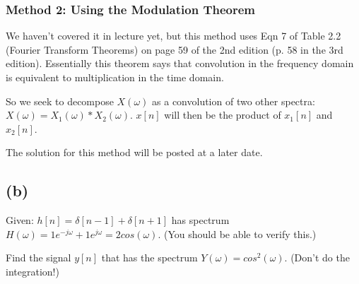 \documentclass[11pt]{article}
\begin{document}
{\subsubsection*{Method 2: Using the Modulation Theorem}
We haven't covered it in lecture yet, but this method uses Eqn 7 of Table 2.2 (Fourier Transform Theorems) on page 59 of the 2nd edition (p. 58 in the 3rd edition). Essentially this theorem says that convolution in the frequency domain is equivalent to multiplication in the time domain.

So we seek to decompose $X(\omega)$ as a convolution of two other spectra: $X(\omega) = X_1(\omega)*X_2(\omega)$. $x[n]$ will then be the product of $x_1[n]$ and $x_2[n]$.
%
%
%
%
%

The solution for this method will be posted at a later date.
}

\subsection*{(b)}
Given: $h[n] = \delta[n-1]+\delta[n+1]$ has spectrum $H(\omega) = 1 e^{-j\omega}+1e^{j\omega}=2cos(\omega)$. (You should be able to verify this.)

Find the signal $y[n]$ that has the spectrum $Y(\omega)=cos^2(\omega)$. (Don't do the integration!)
\end{document}
